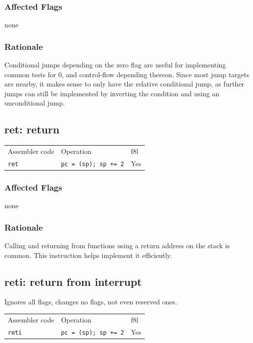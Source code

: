 \documentclass{book}
\begin{document}
\subsubsection*{Affected Flags}

none

\subsubsection*{Rationale}

Conditional jumps depending on the zero flag are useful for implementing common tests for 0, and control-flow depending thereon. Since most jump targets are nearby, it makes sense to only have the relative conditional jump, as further jumps can still be implemented by inverting the condition and using an unconditional jump.


\subsection{ret: return}

\begin{tabular}{l l l}
Assembler code & Operation                   & f8l \\
\texttt{ret}   & \texttt{pc = (sp); sp += 2} & Yes \\
\end{tabular}

\subsubsection*{Affected Flags}

none

\subsubsection*{Rationale}

Calling and returning from functions using a return address on the stack is common. This instruction helps implement it efficiently.


\subsection{reti: return from interrupt}

Ignores all flags, changes no flags, not even reserved ones.

\begin{tabular}{l l l}
Assembler code  & Operation                   & f8l \\
\texttt{reti}   & \texttt{pc = (sp); sp += 2} & Yes \\
\end{tabular}
\end{document}
